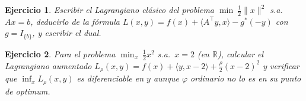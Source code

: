 \documentclass[11pt]{report}
\newtheorem{ex}{Ejercicio}
\newcommand{\R}{\mathbb{R}}
\newcommand{\indic}{I}
\newcommand{\supp}{\sigma}
\begin{document}
\begin{ex}
Escribir el Lagrangiano clásico del problema
$\min\ \tfrac12\|x\|^2$ s.a.\ $Ax=b$, deducirlo de la fórmula
$L(x,y)=f(x)+\langle A^{\!\top}y,x\rangle-g^*(-y)$ con
$g=\indic_{\{b\}}$, y escribir el dual.
\end{ex}

\begin{ex}
Para el problema $\min_x\ \tfrac12x^2$ s.a.\ $x=2$ (en $\R$),
calcular el Lagrangiano aumentado
$L_\rho(x,y)=f(x)+\langle y,x-2\rangle+\tfrac{\rho}{2}(x-2)^2$
y verificar que $\inf_x L_\rho(x,y)$ es diferenciable en $y$
aunque $\varphi$ ordinario no lo es en su punto de optimum.
\end{ex}
\end{document}
